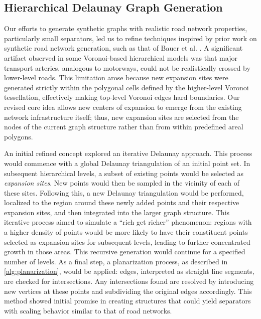 \subsection{Hierarchical Delaunay Graph Generation}
\label{sec:hierarchical_delaunay_generation}

Our efforts to generate synthetic graphs with realistic road network properties, particularly small separators, led us to refine techniques inspired by prior work on synthetic road network generation, such as that of Bauer et al. \cite{hutchison_synthetic_2010}.
A significant artifact observed in some Voronoi-based hierarchical models was that major transport arteries, analogous to motorways, could not be realistically crossed by lower-level roads.
This limitation arose because new expansion sites were generated strictly within the polygonal cells defined by the higher-level Voronoi tessellation, effectively making top-level Voronoi edges hard boundaries.
Our revised core idea allows new centers of expansion to emerge from the existing network infrastructure itself; thus, new expansion sites are selected from the nodes of the current graph structure rather than from within predefined areal polygons.

An initial refined concept explored an iterative Delaunay approach.
This process would commence with a global Delaunay triangulation of an initial point set.
In subsequent hierarchical levels, a subset of existing points would be selected as \emph{expansion sites}.
New points would then be sampled in the vicinity of each of these sites.
Following this, a new Delaunay triangulation would be performed, localized to the region around these newly added points and their respective expansion sites, and then integrated into the larger graph structure.
This iterative process aimed to simulate a \enquote{rich get richer} phenomenon: regions with a higher density of points would be more likely to have their constituent points selected as expansion sites for subsequent levels, leading to further concentrated growth in those areas.
This recursive generation would continue for a specified number of levels.
As a final step, a planarization process, as described in \cref{alg:planarization}, would be applied: edges, interpreted as straight line segments, are checked for intersections. Any intersections found are resolved by introducing new vertices at these points and subdividing the original edges accordingly.
This method showed initial promise in creating structures that could yield separators with scaling behavior similar to that of road networks.

